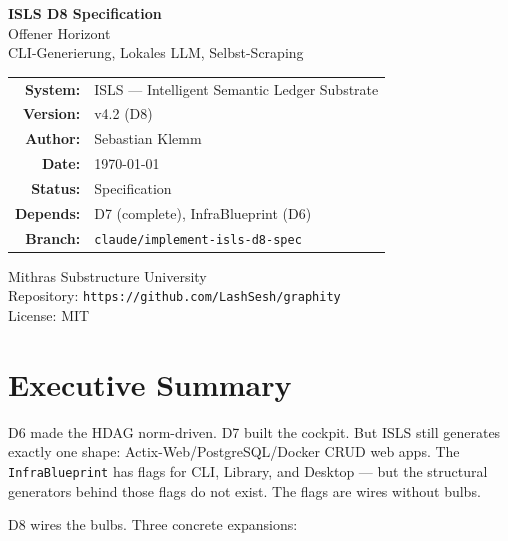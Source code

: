 \documentclass[11pt,a4paper]{article}
\begin{document}
\begin{titlepage}
\centering
\vspace*{2.5cm}

{\Huge\bfseries\color{isls-blue} ISLS D8 Specification}\\[0.5cm]
{\LARGE\color{isls-orange} Offener Horizont}\\[0.3cm]
{\large\color{isls-gray} CLI-Generierung, Lokales LLM, Selbst-Scraping}\\[2cm]

{\large
\begin{tabular}{rl}
\textbf{System:}    & ISLS --- Intelligent Semantic Ledger Substrate \\
\textbf{Version:}   & v4.2 (D8) \\
\textbf{Author:}    & Sebastian Klemm \\
\textbf{Date:}      & \today \\
\textbf{Status:}    & Specification \\
\textbf{Depends:}   & D7 (complete), InfraBlueprint (D6) \\
\textbf{Branch:}    & \texttt{claude/implement-isls-d8-spec} \\
\end{tabular}
}

\vfill

{\small\color{isls-gray}
Mithras Substructure University\\
Repository: \texttt{https://github.com/LashSesh/graphity}\\
License: MIT
}
\end{titlepage}

\tableofcontents
\newpage


\section{Executive Summary}

D6 made the HDAG norm-driven. D7 built the cockpit. But ISLS still 
generates exactly one shape: Actix-Web/PostgreSQL/Docker CRUD web 
apps. The \texttt{InfraBlueprint} has flags for CLI, Library, and 
Desktop --- but the structural generators behind those flags do not 
exist. The flags are wires without bulbs.

D8 wires the bulbs. Three concrete expansions:
\end{document}
